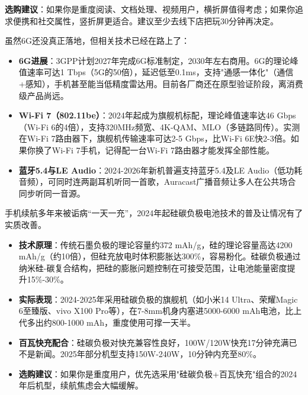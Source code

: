 \textbf{选购建议}：如果你是重度阅读、文档处理、视频用户，横折屏值得考虑；如果你追求便携和社交属性，竖折屏更适合。建议至少去线下店把玩30分钟再决定。


虽然6G还没真正落地，但相关技术已经在路上了：

\begin{itemize}
  \item \textbf{6G进展}：3GPP计划2027年完成6G标准制定，2030年左右商用。6G的理论峰值速率可达1 Tbps（5G的50倍），延迟低至0.1ms，支持"通感一体化"（通信+感知），手机甚至能当低精度雷达用。目前各厂商还在原型验证阶段，离消费级产品尚远。
  \item \textbf{Wi-Fi 7（802.11be）}：2024年起成为旗舰机标配，理论峰值速率达46 Gbps（Wi-Fi 6的4倍），支持320MHz频宽、4K-QAM、MLO（多链路同传）。实测在Wi-Fi 7路由器下，旗舰机传输速率可达2-5 Gbps，比Wi-Fi 6E快2-3倍。如果你换了Wi-Fi 7手机，记得配一台Wi-Fi 7路由器才能发挥全部性能。
  \item \textbf{蓝牙5.4与LE Audio}：2024-2026年新机普遍支持蓝牙5.4及LE Audio（低功耗音频），可同时连两副耳机听同一首歌，Auracast广播音频让多人在公共场合同步听同一音源。
\end{itemize}


手机续航多年来被诟病“一天一充”，2024年起硅碳负极电池技术的普及让情况有了实质改善。

\begin{itemize}
  \item \textbf{技术原理}：传统石墨负极的理论容量约372 mAh/g，硅的理论容量高达4200 mAh/g（约10倍），但硅充放电时体积膨胀达300\%，容易粉化。硅碳负极通过纳米硅-碳复合结构，把硅的膨胀问题控制在可接受范围，让电池能量密度提升15\%-30\%。
  \item \textbf{实际表现}：2024-2025年采用硅碳负极的旗舰机（如小米14 Ultra、荣耀Magic 6至臻版、vivo X100 Pro等），在7-8mm机身内塞进5000-6000 mAh电池，比上代多出约800-1000 mAh，重度使用可撑一天半。
  \item \textbf{百瓦快充配合}：硅碳负极对快充兼容性良好，100W/120W快充17分钟充满已不是新闻。2025年部分机型支持150W-240W，10分钟内充至80\%。
  \item \textbf{选购建议}：如果你是重度用户，优先选采用"硅碳负极+百瓦快充"组合的2024年后机型，续航焦虑会大幅缓解。
\end{itemize}


